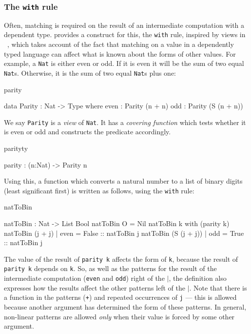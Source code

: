 \subsubsection{The \texttt{with} rule}

Often, matching is required on the result of an intermediate computation
with a dependent type.
\Idris{} provides a construct for this, the \texttt{with} rule, 
inspired by views in \Epigram~\cite{McBride2004a},
which takes account of the
fact that matching on a value in a dependently typed language can affect what
is known about the forms of other values. 
%
For example, a \texttt{Nat} is either even or odd. 
If it is even it will
be the sum of two equal \texttt{Nat}s. Otherwise, it is the sum of two equal \texttt{Nat}s 
plus one:

\begin{SaveVerbatim}{parity}

data Parity : Nat -> Type where
   even : Parity (n + n)
   odd  : Parity (S (n + n))

\end{SaveVerbatim}

\noindent
We say \texttt{Parity} is a \emph{view} of \texttt{Nat}. 
It has a \emph{covering function} which tests whether
it is even or odd and constructs the predicate accordingly.

\begin{SaveVerbatim}{parityty}

parity : (n:Nat) -> Parity n

\end{SaveVerbatim}

\noindent
Using this, a function which converts a natural number to a list
of binary digits (least significant first) is written as follows, using the \texttt{with}
rule:

\begin{SaveVerbatim}{natToBin}

natToBin : Nat -> List Bool
natToBin O = Nil
natToBin k with (parity k)
   natToBin (j + j)     | even = False :: natToBin j
   natToBin (S (j + j)) | odd  = True  :: natToBin j

\end{SaveVerbatim}

\noindent
The value of the result of \texttt{parity k} affects the form of \texttt{k}, 
because the result
of \texttt{parity k} depends on \texttt{k}. 
So, as well as the patterns for the result of the
intermediate computation (\texttt{even} and \texttt{odd}) right of the 
\texttt{$\mid$}, the definition also expresses how
the results affect the other patterns left of the $\mid$. Note that there is a
function in the patterns (\texttt{+}) and repeated occurrences of \texttt{j} --- 
this is allowed
because another argument has determined the form of these patterns. In general,
non-linear patterns are allowed \emph{only} when their value is forced by
some other argument.


